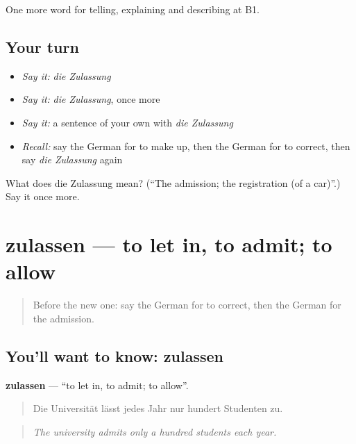 \begin{grammarlens}[title={What you've built}]
One more word for telling, explaining and describing at B1.
\end{grammarlens}

\subsection*{Your turn}
\begin{itemize}
\raggedright
  \item \emph{Say it:} \emph{die Zulassung}
  \item \emph{Say it:} \emph{die Zulassung}, once more
  \item \emph{Say it:} a sentence of your own with \emph{die Zulassung}
  \item \emph{Recall:} say the German for to make up, then the German for to correct, then say \emph{die Zulassung} again
\end{itemize}

\begin{tcolorbox}[breakable,colback=teal!4,colframe=teal!35!black,title={Before you move on}]
What does die Zulassung mean? (\textquotedblleft{}The admission; the registration (of a car)\textquotedblright{}.) Say it once more.
\end{tcolorbox}
\section[zulassen]{zulassen — to let in, to admit; to allow}

\label{lesson:GE-C380-zulassen}



\begin{quote}
Before the new one: say the German for to correct, then the German for the admission.
\end{quote}

\subsection*{You'll want to know: zulassen}
\textbf{zulassen} — \textquotedblleft{}to let in, to admit; to allow\textquotedblright{}.

\begin{quote}
Die Universität lässt jedes Jahr nur hundert Studenten zu.
\end{quote}

\begin{quote}
\emph{The university admits only a hundred students each year.}
\end{quote}

